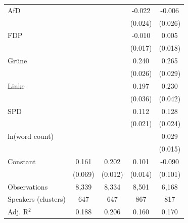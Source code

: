 \begin{table}[htbp]
\begin{tabular}{l*{4}{c}}
AfD                 &                     &                     &      -0.022         &      -0.006         \\
                    &                     &                     &     (0.024)         &     (0.026)         \\
\addlinespace
FDP                 &                     &                     &      -0.010         &       0.005         \\
                    &                     &                     &     (0.017)         &     (0.018)         \\
\addlinespace
Grüne               &                     &                     &       0.240\sym{***}&       0.265\sym{***}\\
                    &                     &                     &     (0.026)         &     (0.029)         \\
\addlinespace
Linke               &                     &                     &       0.197\sym{***}&       0.230\sym{***}\\
                    &                     &                     &     (0.036)         &     (0.042)         \\
\addlinespace
SPD                 &                     &                     &       0.112\sym{***}&       0.128\sym{***}\\
                    &                     &                     &     (0.021)         &     (0.024)         \\
\addlinespace
ln(word count)      &                     &                     &                     &       0.029\sym{*}  \\
                    &                     &                     &                     &     (0.015)         \\
\addlinespace
Constant            &       0.161\sym{**} &       0.202\sym{***}&       0.101\sym{***}&      -0.090         \\
                    &     (0.069)         &     (0.012)         &     (0.014)         &     (0.101)         \\
\midrule
Observations        &       8,339         &       8,334         &       8,501         &       6,168         \\
Speakers (clusters) &         647         &         647         &         867         &         817         \\
Adj. R$^2$          &       0.188         &       0.206         &       0.160         &       0.170         \\

\end{tabular}
\end{table}
